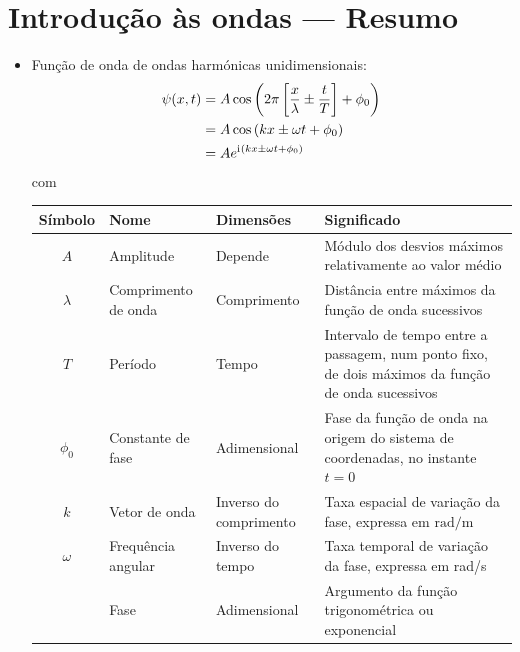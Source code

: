 \section{Introdução às ondas --- Resumo}
\begin{itemize}
\item
    Função de onda de ondas harmónicas unidimensionais:
    \begin{align*}
      \psi(x,t)&=A\cos\left(2\pi\left[\frac{x}{\lambda}\pm\frac{t}{T}\right]+
                \phi_0\right)\\
               &=A\cos\left(kx\pm\omega t+\phi_0\right)\\
               &=Ae^{\text{i}\mkern1mu (kx\pm\omega t+\phi_0)}
    \end{align*}
    com
    \begin{center}
    \begin{tabular}{c|l|l|l}
    \hline
    \rule{0mm}{3ex} Símbolo&Nome&Dimensões&Significado\\[0.5ex]
    \hline
    $A$ & Amplitude & Depende&
        \parbox[t]{0.3\textwidth}{\rule{0mm}{4ex}Módulo dos desvios máxi\-mos
        relativamente ao valor médio}\\
    $\lambda$ & Comprimento de onda & Comprimento &
        \parbox[t]{0.3\textwidth}{\rule{0mm}{4ex}Distância entre máximos da função
        de onda sucessivos} \\
    $T$ & Período & Tempo &
        \parbox[t]{0.3\textwidth}{\rule{0mm}{4ex}Intervalo de tempo entre a
        passagem, num ponto fixo, de dois máximos da função de onda sucessivos}
    \\
    $\phi_0$&Constante de fase&Adimensional&
        \parbox[t]{0.3\textwidth}{\rule{0mm}{4ex}Fase da função de onda na
        origem do sistema de coordenadas, no instante $t=0$}\\
    $k$&Vetor de onda&
        \parbox[t]{0.2\textwidth}{Inverso do comprimento}&
        \parbox[t]{0.3\textwidth}{\rule{0mm}{4ex}Taxa espacial de variação da fase,
        expressa em $\text{rad}/\text{m}$}\\
    $\omega$&Frequência angular &
        \parbox[t]{0.2\textwidth}{Inverso do tempo}&
        \parbox[t]{0.3\textwidth}{\rule{0mm}{4ex}Taxa temporal de variação da
        fase, expressa em rad/s}
        \\
        &Fase& Adimensional &\parbox[t]{0.3\textwidth}{\rule{0mm}{4ex}%
          Argumento da função trigonométrica ou exponencial}
    \\[3ex]
    \hline
    \end{tabular}

\end{center}
\end{itemize}
